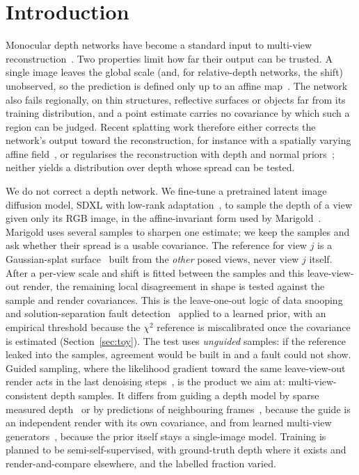\section{Introduction}
\label{sec:intro}
Monocular depth networks have become a standard input to multi-view reconstruction~\cite{yang2024depthanythingv2,bochkovskii2025depthpro,yu2022monosdf,turkulainen2025dnsplatter}.
Two properties limit how far their output can be trusted.
A single image leaves the global scale (and, for relative-depth networks, the shift) unobserved, so the prediction is defined only up to an affine map~\cite{ranftl2022midas,ke2024marigold}.
The network also fails regionally, on thin structures, reflective surfaces or objects far from its training distribution, and a point estimate carries no covariance by which such a region can be judged.
Recent splatting work therefore either corrects the network's output toward the reconstruction, for instance with a spatially varying affine field~\cite{tse2026affinegs}, or regularises the reconstruction with depth and normal priors~\cite{turkulainen2025dnsplatter,li2024dngaussian}; neither yields a distribution over depth whose spread can be tested.

We do not correct a depth network.
We fine-tune a pretrained latent image diffusion model, SDXL with low-rank adaptation~\cite{podell2023sdxl,hu2021lora}, to sample the depth of a view given only its RGB image, in the affine-invariant form used by Marigold~\cite{ke2024marigold}.
Marigold uses several samples to sharpen one estimate; we keep the samples and ask whether their spread is a usable covariance.
The reference for view $j$ is a Gaussian-splat surface~\cite{huang2024twodgs} built from the \emph{other} posed views, never view $j$ itself.
After a per-view scale and shift is fitted between the samples and this leave-view-out render, the remaining local disagreement in shape is tested against the sample and render covariances.
This is the leave-one-out logic of data snooping and solution-separation fault detection~\cite{baarda1968testing,blanch2012araim} applied to a learned prior, with an empirical threshold because the $\chi^2$ reference is miscalibrated once the covariance is estimated (Section~\ref{sec:toy}).
The test uses \emph{unguided} samples: if the reference leaked into the samples, agreement would be built in and a fault could not show.
Guided sampling, where the likelihood gradient toward the same leave-view-out render acts in the last denoising steps~\cite{chung2023dps}, is the product we aim at: multi-view-consistent depth samples.
It differs from guiding a depth model by sparse measured depth~\cite{viola2025marigolddc} or by predictions of neighbouring frames~\cite{depthsync2025}, because the guide is an independent render with its own covariance, and from learned multi-view generators~\cite{guizilini2025mvgd}, because the prior itself stays a single-image model.
Training is planned to be semi-self-supervised, with ground-truth depth where it exists and render-and-compare elsewhere, and the labelled fraction varied.

